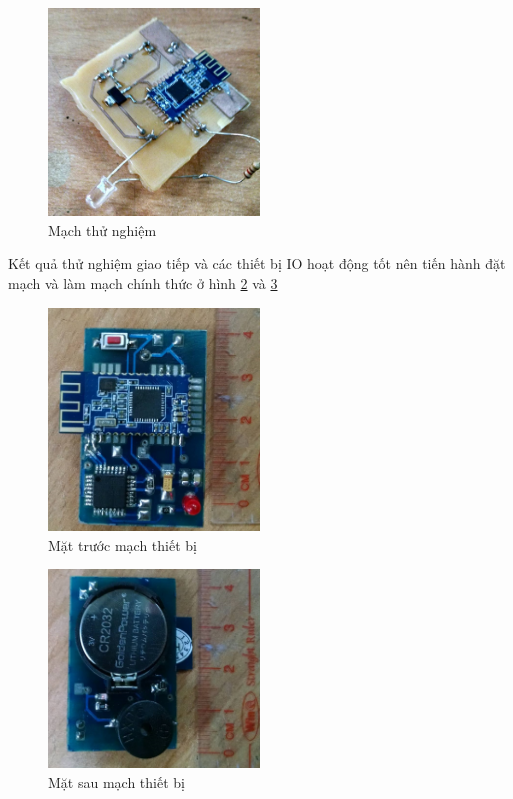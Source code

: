 	\begin{figure}[H]
		\centering    
		\includegraphics[width=0.5\textwidth]{keydraft}
		\caption[Mạch thử nghiệm]{Mạch thử nghiệm}
		\label{fig: keydraft}
	\end{figure}

Kết quả thử nghiệm giao tiếp và các thiết bị IO hoạt động tốt nên tiến hành đặt mạch và làm mạch chính thức ở hình \ref{fig: key1} và \ref{fig: key2}

	\begin{figure}[H]
		\centering    
		\includegraphics[width=0.5\textwidth]{key1}
		\caption[Mặt trước mạch thiết bị]{Mặt trước mạch thiết bị}
		\label{fig: key1}
	\end{figure}	
	
	\begin{figure}[H]
		\centering    
		\includegraphics[width=0.5\textwidth]{key2}
		\caption[Mặt sau mạch thiết bị]{Mặt sau mạch thiết bị}
		\label{fig: key2}
	\end{figure}	
	
